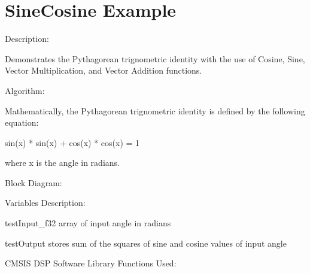 \hypertarget{group___sin_cos_example}{\section{Sine\-Cosine Example}
\label{group___sin_cos_example}
}
\begin{DoxyParagraph}{Description\-:}

\end{DoxyParagraph}
\begin{DoxyParagraph}{}
Demonstrates the Pythagorean trignometric identity with the use of Cosine, Sine, Vector Multiplication, and Vector Addition functions.
\end{DoxyParagraph}
\begin{DoxyParagraph}{Algorithm\-:}

\end{DoxyParagraph}
\begin{DoxyParagraph}{}
Mathematically, the Pythagorean trignometric identity is defined by the following equation\-: 
\begin{DoxyPre}sin(x) * sin(x) + cos(x) * cos(x) = 1\end{DoxyPre}
 where {\ttfamily x} is the angle in radians.
\end{DoxyParagraph}
\begin{DoxyParagraph}{Block Diagram\-:}

\end{DoxyParagraph}
\begin{DoxyParagraph}{}

\end{DoxyParagraph}
\begin{DoxyParagraph}{Variables Description\-:}

\end{DoxyParagraph}
\begin{DoxyParagraph}{}
\begin{DoxyItemize}
\item {\ttfamily test\-Input\-\_\-f32} array of input angle in radians \item {\ttfamily test\-Output} stores sum of the squares of sine and cosine values of input angle\end{DoxyItemize}

\end{DoxyParagraph}
\begin{DoxyParagraph}{C\-M\-S\-I\-S D\-S\-P Software Library Functions Used\-:}

\end{DoxyParagraph}
